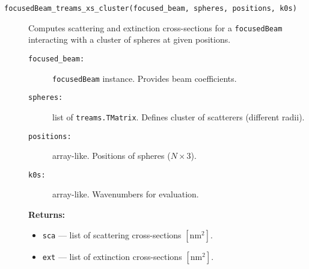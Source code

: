 \begin{description}
    \item[\texttt{focusedBeam\_treams\_xs\_cluster(focused\_beam, spheres, positions, k0s)}]
    Computes scattering and extinction cross-sections for a \texttt{focusedBeam} interacting with a cluster of spheres at given positions.
    \begin{description}
        \item[\texttt{focused\_beam:}] \texttt{focusedBeam} instance. Provides beam coefficients.
        \item[\texttt{spheres:}] list of \texttt{treams.TMatrix}. Defines cluster of scatterers (different radii).
        \item[\texttt{positions:}] array-like. Positions of spheres (\( N \times 3 \)).
        \item[\texttt{k0s:}] array-like. Wavenumbers for evaluation.
    \end{description}
    \textbf{Returns:}
    \begin{itemize}
        \item \texttt{sca} — list of scattering cross-sections \([\text{nm}^2]\).
        \item \texttt{ext} — list of extinction cross-sections \([\text{nm}^2]\).
    \end{itemize}
\end{description}